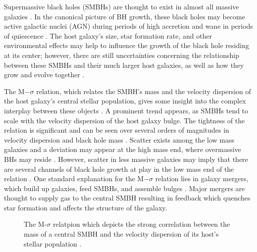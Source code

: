 \documentclass[12pt,headA,chapB]{fiskthesis}
\begin{document}
Supermassive black holes (SMBHs) are thought to exist in almost all massive galaxies \citep{Kormendy2013}. In the canonical picture of BH growth, these black holes may become active galactic nuclei (AGN) during periods of high accretion and wane in periods of quiescence \citep{Alexander2005,Papovich2006,Volonteri2012}. The host galaxy's size, star formation rate, and other environmental effects may help to influence the growth of the black hole residing at its center; however, there are still uncertainties concerning the relationship between these SMBHs and their much larger host galaxies, as well as how they grow and evolve together \citep{Haehnelt2000,DiMatteo2005,Hopkins2006,Fu2008,Sijacki2009,Silverman2009,Mullaney2012}.

The M$-\sigma$ relation, which relates the SMBH's mass and the velocity dispersion of the host galaxy's central stellar population, gives some insight into the complex interplay between these objects \citep{Ferrarese2000}. A prominent trend appears, as SMBHs tend to scale with the velocity dispersion of the host galaxy bulge. The tightness of the relation is significant and can be seen over several orders of magnitudes in velocity dispersion and black hole mass \citep{Merritt2001,Graham2011,Mcconnell2013,Kormendy2013}. Scatter exists among the low mass galaxies and a deviation may appear at the high mass end, where overmassive BHs may reside \citep{VanDenBosch2007,Moster2010,Natarajan2011}. However, scatter in less massive galaxies may imply that there are several channels of black hole growth at play in the low mass end of the relation \citep{Micic2007,Volonteri2009,Reines2013,Graham2014}. One standard explanation for the M$-\sigma$ relation lies in galaxy mergers, which build up galaxies, feed SMBHs, and assemble bulges \citep{DiMatteo2005,Shen2008}. Major mergers are thought to supply gas to the central SMBH resulting in feedback which quenches star formation and affects the structure of the galaxy. 

\begin{figure}
\centerline{}
\caption[M-$\sigma$ Relation]{The M-$\sigma$ relatpion which depicts the strong correlation between the mass of a central SMBH and the velocity dispersion of its host's stellar population \citep{Xiao2011}.}
\label{msigma} 
\end{figure}

\end{document}
